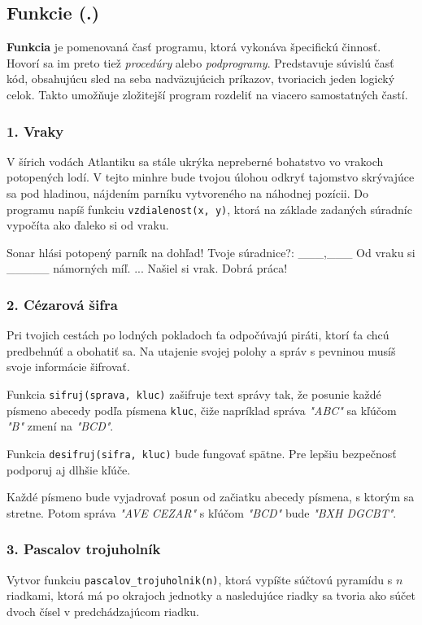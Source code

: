 \subsection{Funkcie (.)}
\textbf{Funkcia} je pomenovaná časť programu, ktorá vykonáva špecifickú činnosť. Hovorí sa im preto tiež \textit{procedúry} alebo \textit{podprogramy}. Predstavuje súvislú časť kód, obsahujúcu sled na seba nadväzujúcich príkazov, tvoriacich jeden logický celok.  Takto umožňuje zložitejší program rozdeliť na viacero samostatných častí.


\subsubsection*{1. Vraky}
V šírich vodách Atlantiku sa stále ukrýka nepreberné bohatstvo vo vrakoch potopených lodí. V tejto minhre bude tvojou úlohou odkryť tajomstvo skrývajúce sa pod hladinou, nájdením parníku vytvoreného na náhodnej pozícii. Do programu napíš funkciu \verb|vzdialenost(x, y)|, ktorá na základe zadaných súradníc vypočíta ako ďaleko si od vraku.

\begin{code}
Sonar hlási potopený parník na dohľad!
Tvoje súradnice?: ___,___
Od vraku si _____ námorných míľ.
...
Našiel si vrak. Dobrá práca!
\end{code}


\subsubsection*{2. Cézarová šifra}
Pri tvojich cestách po lodných pokladoch ťa odpočúvajú piráti, ktorí ťa chcú predbehnúť a obohatiť sa. Na utajenie svojej polohy a správ s pevninou musíš svoje informácie šifrovať. 

Funkcia \verb|sifruj(sprava, kluc)| zašifruje text správy tak, že posunie každé písmeno abecedy podľa písmena \verb|kluc|, čiže napríklad správa \emph{"ABC"} sa kľúčom \emph{"B"} zmení na \emph{"BCD"}. 

Funkcia \verb|desifruj(sifra, kluc)| bude fungovať spätne.  Pre lepšiu bezpečnosť podporuj aj dlhšie kľúče. 

Každé písmeno bude vyjadrovať posun od začiatku abecedy písmena, s ktorým sa stretne. Potom správa \emph{"AVE CEZAR"} s kľúčom \emph{"BCD"} bude \emph{"BXH DGCBT"}.


\subsubsection*{3. Pascalov trojuholník}
Vytvor funkciu \verb|pascalov_trojuholnik(n)|, ktorá vypíšte súčtovú pyramídu s $n$ riadkami, ktorá má po okrajoch jednotky a nasledujúce riadky sa tvoria ako súčet dvoch čísel v predchádzajúcom riadku.

